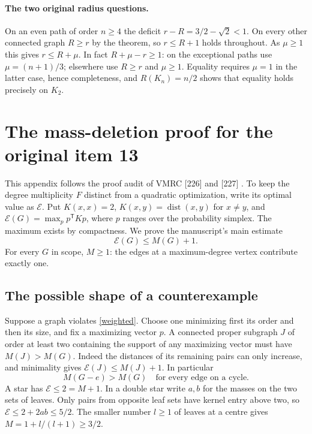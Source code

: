 \documentclass[11pt,a4paper]{article}
\theoremstyle{remark}\newtheorem*{remark}{Remark}
\DeclareMathOperator{\dist}{dist}
\begin{document}
\paragraph{The two original radius questions.} On an even path of order $n\ge4$ the deficit $r-R=3/2-\sqrt2<1$. On every other connected graph $R\ge r$ by the theorem, so $r\le R+1$ holds throughout. As $\mu\ge1$ this gives $r\le R+\mu$. In fact $R+\mu-r\ge1$: on the exceptional paths use $\mu=(n+1)/3$; elsewhere use $R\ge r$ and $\mu\ge1$. Equality requires $\mu=1$ in the latter case, hence completeness, and $R(K_n)=n/2$ shows that equality holds precisely on $K_2$.

\section{The mass-deletion proof for the original item 13}\label{sec:mass}
This appendix follows the proof audit of VMRC [226] and [227] \cite{audited,mass-audit}. To keep the degree multiplicity $F$ distinct from a quadratic optimization, write its optimal value as $\mathcal E$. Put $K(x,x)=2$, $K(x,y)=\dist(x,y)$ for $x\ne y$, and $\mathcal E(G)=\max_{p}p^{\mathsf T}Kp$, where $p$ ranges over the probability simplex. The maximum exists by compactness. We prove the manuscript's main estimate
\begin{equation} \mathcal E(G)\le M(G)+1.\label{weighted}\tag{W}\end{equation}
For every $G$ in scope, $M\ge1$: the edges at a maximum-degree vertex contribute exactly one.
\subsection{The possible shape of a counterexample}
Suppose a graph violates \eqref{weighted}. Choose one minimizing first its order and then its size, and fix a maximizing vector $p$. A connected proper subgraph $J$ of order at least two containing the support of any maximizing vector must have $M(J)>M(G)$. Indeed the distances of its remaining pairs can only increase, and minimality gives $\mathcal E(J)\le M(J)+1$. In particular
\begin{equation}
 M(G-e)>M(G)\quad\text{for every edge on a cycle.}\label{supportive}
\end{equation}
A star has $\mathcal E\le2=M+1$. In a double star write $a,b$ for the masses on the two sets of leaves. Only pairs from opposite leaf sets have kernel entry above two, so $\mathcal E\le2+2ab\le5/2$. The smaller number $l\ge1$ of leaves at a centre gives $M=1+l/(l+1)\ge3/2$.
\end{document}
